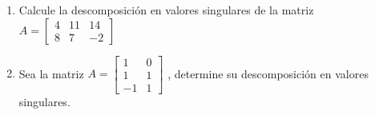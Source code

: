 \documentclass[12pt]{article}
\newenvironment{preguntas}
{\begin{enumerate}\itemsep12pt
	}
	{
	\end{enumerate}
}
\begin{document}
\begin{preguntas}
\begin{enumerate}[a)]
		en una sin términos con producto cruzado.
\end{enumerate}
\item Calcule la descomposición en valores singulares de la matriz $A = \begin{bmatrix}4 & 11 & 14\\ 8 & 7 & -2\end{bmatrix}$
\item Sea la matriz
	$A = \begin{bmatrix}
	1 & 0 \\1 & 1 \\
	-1 & 1
	\end{bmatrix}$
	, determine su descomposición en valores singulares.
\end{preguntas}
\end{document}
